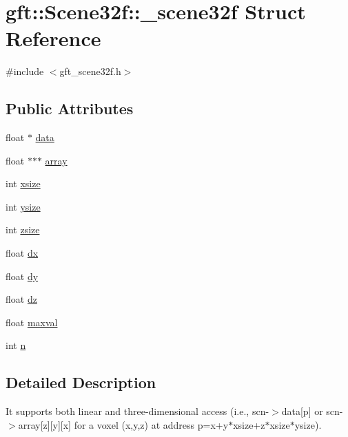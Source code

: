 \hypertarget{structgft_1_1Scene32f_1_1__scene32f}{}\section{gft\+:\+:Scene32f\+:\+:\+\_\+scene32f Struct Reference}
\label{structgft_1_1Scene32f_1_1__scene32f}


{\ttfamily \#include $<$gft\+\_\+scene32f.\+h$>$}

\subsection*{Public Attributes}
\begin{DoxyCompactItemize}
\item 
float $\ast$ \hyperlink{structgft_1_1Scene32f_1_1__scene32f_a48c77000dc972198c1e0220e134b7fa3}{data}
\item 
float $\ast$$\ast$$\ast$ \hyperlink{structgft_1_1Scene32f_1_1__scene32f_a3a807a5184276499e5ed8c4f0bc0231f}{array}
\item 
int \hyperlink{structgft_1_1Scene32f_1_1__scene32f_a32ab97e321670304cc58d77a93f6ae98}{xsize}
\item 
int \hyperlink{structgft_1_1Scene32f_1_1__scene32f_ae43a5a80f36b566a064c204195b0d97e}{ysize}
\item 
int \hyperlink{structgft_1_1Scene32f_1_1__scene32f_a2edf3aef02f61feb5b316fc0ee3db854}{zsize}
\item 
float \hyperlink{structgft_1_1Scene32f_1_1__scene32f_a1547544d49357f4fade40bc93ffb1d17}{dx}
\item 
float \hyperlink{structgft_1_1Scene32f_1_1__scene32f_aa33058e48dc15e753b50e59ec2a935d7}{dy}
\item 
float \hyperlink{structgft_1_1Scene32f_1_1__scene32f_a901514039bf88c7c6373c9e1980416f4}{dz}
\item 
float \hyperlink{structgft_1_1Scene32f_1_1__scene32f_ab041f7af2382a7c2088b2e2257bbe2d3}{maxval}
\item 
int \hyperlink{structgft_1_1Scene32f_1_1__scene32f_af712496c9e2a26f8e761c2dcd0433ab9}{n}
\end{DoxyCompactItemize}


\subsection{Detailed Description}
It supports both linear and three-\/dimensional access (i.\+e., scn-\/$>$data\mbox{[}p\mbox{]} or scn-\/$>$array\mbox{[}z\mbox{]}\mbox{[}y\mbox{]}\mbox{[}x\mbox{]} for a voxel (x,y,z) at address p=x+y$\ast$xsize+z$\ast$xsize$\ast$ysize). 

